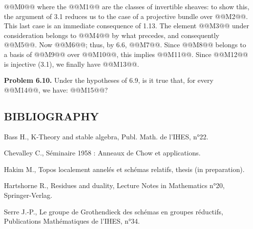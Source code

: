 @@M0@@
where the @@M1@@ are the classes of invertible sheaves: to show this, the argument of 3.1 reduces us to the case of a projective bundle over @@M2@@. This last case is an immediate consequence of 1.13. The element @@M3@@ under consideration belongs to @@M4@@ by what precedes, and consequently @@M5@@. Now @@M6@@; thus, by 6.6, @@M7@@. Since @@M8@@ belongs to a basis of @@M9@@ over @@M10@@, this implies @@M11@@. Since @@M12@@ is injective (3.1), we finally have @@M13@@.

\textbf{Problem 6.10.} Under the hypotheses of 6.9, is it true that, for every @@M14@@, we have: @@M15@@?

\subsection*{BIBLIOGRAPHY}
\begin{enumerate}[label={\textup{[\arabic*]}}]
\item Bass H., K-Theory and stable algebra, Publ. Math. de l'IHES, n°22.
\item Chevalley C., Séminaire 1958 : Anneaux de Chow et applications.
\item Hakim M., Topos localement annelés et schémas relatifs, thesis (in preparation).
\item Hartshorne R., Residues and duality, Lecture Notes in Mathematics n°20, Springer-Verlag.
\item Serre J.-P., Le groupe de Grothendieck des schémas en groupes réductifs, Publications Mathématiques de l'IHES, n°34.
\end{enumerate}

\providecommand{\Kosz}{\mathrm K}
\providecommand{\Proj}{\operatorname{Proj}}
\providecommand{\Sym}{\operatorname{Sym}}
\providecommand{\gr}{\operatorname{gr}}
\providecommand{\Tor}{\operatorname{Tor}}
\providecommand{\Spec}{\operatorname{Spec}}
\providecommand{\Imf}{\operatorname{Im}}
\providecommand{\Ker}{\operatorname{Ker}}
\providecommand{\Id}{\operatorname{Id}}
\providecommand{\rad}{\operatorname{rad}}
\providecommand{\cO}{\mathcal O}
\providecommand{\cS}{\mathcal S}
\providecommand{\cJ}{\mathcal J}
\providecommand{\cN}{\mathcal N}
\providecommand{\bfP}{\mathbf P}
\providecommand{\bfA}{\mathbf A}

\providecommand{\Kosz}{\mathrm K}
\providecommand{\Proj}{\operatorname{Proj}}
\providecommand{\Sym}{\operatorname{Sym}}
\providecommand{\gr}{\operatorname{gr}}
\providecommand{\Tor}{\operatorname{Tor}}
\providecommand{\Spec}{\operatorname{Spec}}
\providecommand{\Imf}{\operatorname{Im}}
\providecommand{\Ker}{\operatorname{Ker}}
\providecommand{\Id}{\operatorname{Id}}
\providecommand{\rad}{\operatorname{rad}}
\providecommand{\cO}{\mathcal O}
\providecommand{\cS}{\mathcal S}
\providecommand{\cJ}{\mathcal J}
\providecommand{\cN}{\mathcal N}
\providecommand{\bfP}{\mathbf P}
\providecommand{\bfA}{\mathbf A}

